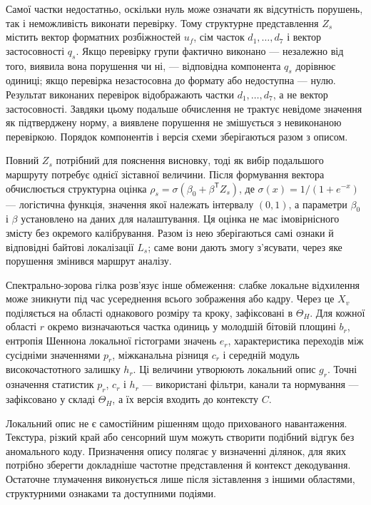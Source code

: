 Самої частки недостатньо, оскільки нуль може означати як відсутність порушень, так і неможливість виконати перевірку. Тому структурне представлення $Z_s$ містить вектор форматних розбіжностей $u_f$, сім часток $d_1,\ldots,d_7$ і вектор застосовності $q_s$. Якщо перевірку групи фактично виконано --- незалежно від того, виявила вона порушення чи ні, --- відповідна компонента $q_s$ дорівнює одиниці; якщо перевірка незастосовна до формату або недоступна --- нулю. Результат виконаних перевірок відображають частки $d_1,\ldots,d_7$, а не вектор застосовності. Завдяки цьому подальше обчислення не трактує невідоме значення як підтверджену норму, а виявлене порушення не змішується з невиконаною перевіркою. Порядок компонентів і версія схеми зберігаються разом з описом.

Повний $Z_s$ потрібний для пояснення висновку, тоді як вибір подальшого маршруту потребує однієї зіставної величини. Після формування вектора обчислюється структурна оцінка $\rho_s=\sigma(\beta_0+\beta^{\mathsf T}Z_s)$, де $\sigma(x)=1/(1+e^{-x})$ --- логістична функція, значення якої належать інтервалу $(0,1)$, а параметри $\beta_0$ і $\beta$ установлено на даних для налаштування. Ця оцінка не має імовірнісного змісту без окремого калібрування. Разом із нею зберігаються самі ознаки й відповідні байтові локалізації $L_s$; саме вони дають змогу з’ясувати, через яке порушення змінився маршрут аналізу.

Спектрально-зорова гілка розв’язує інше обмеження: слабке локальне відхилення може зникнути під час усереднення всього зображення або кадру. Через це $X_v$ поділяється на області однакового розміру та кроку, зафіксовані в $\Theta_H$. Для кожної області $r$ окремо визначаються частка одиниць у молодшій бітовій площині $b_r$, ентропія Шеннона локальної гістограми значень $e_r$, характеристика переходів між сусідніми значеннями $p_r$, міжканальна різниця $c_r$ і середній модуль високочастотного залишку $h_r$. Ці величини утворюють локальний опис $g_r$. Точні означення статистик $p_r$, $c_r$ і $h_r$ --- використані фільтри, канали та нормування --- зафіксовано у складі $\Theta_H$, а їх версія входить до контексту $C$.

Локальний опис не є самостійним рішенням щодо прихованого навантаження. Текстура, різкий край або сенсорний шум можуть створити подібний відгук без аномального коду. Призначення опису полягає у визначенні ділянок, для яких потрібно зберегти докладніше частотне представлення й контекст декодування. Остаточне тлумачення виконується лише після зіставлення з іншими областями, структурними ознаками та доступними подіями.


